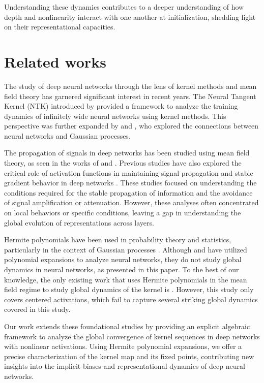 \documentclass[twoside]{article}
\theoremstyle{definition}
\begin{document}
Understanding these dynamics contributes to a deeper understanding of how depth and nonlinearity interact with one another at initialization, shedding light on their representational capacities.


\section{Related works}
The study of deep neural networks through the lens of kernel methods and mean field theory has garnered significant interest in recent years. The Neural Tangent Kernel (NTK) introduced by \citet{jacot2018neural} provided a framework to analyze the training dynamics of infinitely wide neural networks using kernel methods. This perspective was further expanded by \citet{lee2019wide} and \citet{arora2019exact}, who explored the connections between neural networks and Gaussian processes.

The propagation of signals in deep networks has been studied using mean field theory, as seen in the works of \citet{schoenholz2016deep} and \citet{pennington2017resurrecting}.  Previous studies have also explored the critical role of activation functions in maintaining signal propagation and stable gradient behavior in deep networks \citep{hayou2019impact}. These studies focused on understanding the conditions required for the stable propagation of information and the avoidance of signal amplification or attenuation. However, these analyses often concentrated on local behaviors or specific conditions, leaving a gap in understanding the global evolution of representations across layers. 

Hermite polynomials have been used in probability theory and statistics, particularly in the context of Gaussian processes \citep{williams2006gaussian}. Although \citet{poole2016exponential} and \citet{daniely2016toward} have utilized polynomial expansions to analyze neural networks, they do not study global dynamics in neural networks, as presented in this paper. To the best of our knowledge, the only existing work that uses Hermite polynomials in the mean field regime to study global dynamics of the kernel is \citet{joudaki2023impact}. However, this study only covers centered activations, which fail to capture several striking global dynamics covered in this study.

Our work extends these foundational studies by providing an explicit algebraic framework to analyze the global convergence of kernel sequences in deep networks with nonlinear activations. Using Hermite polynomial expansions, we offer a precise characterization of the kernel map and its fixed points, contributing new insights into the implicit biases and representational dynamics of deep neural networks.
\end{document}

